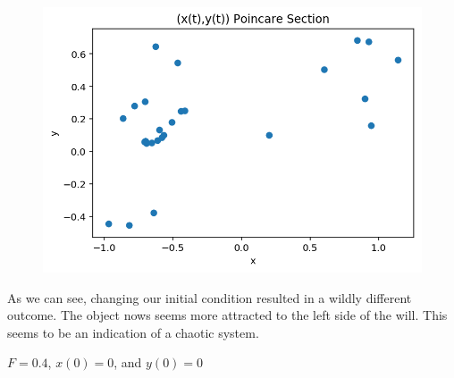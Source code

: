 \documentclass{article}
\begin{document}
\begin{figure}[h!]
\includegraphics[scale=0.4]{poincare4.png}
\end{figure}

As we can see, changing our initial condition resulted in a wildly different outcome. The object nows seems more attracted to the left side of the will. This seems to be an indication of a chaotic system.

$F = 0.4$, $x(0) = 0$, and $y(0) = 0$
\end{document}
